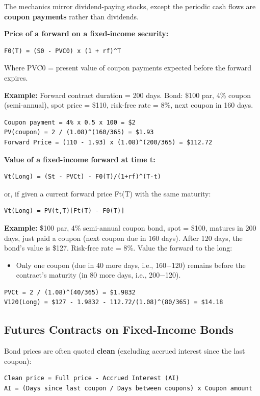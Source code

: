 \documentclass[12pt,openany]{book}
\theoremstyle{definition}
\theoremstyle{remark}
\begin{document}
The mechanics mirror dividend-paying stocks, except the periodic cash flows are \textbf{coupon payments} rather than dividends.

\textbf{Price of a forward on a fixed-income security:}
\begin{lstlisting}[style=notesCode]
F0(T) = (S0 - PVC0) x (1 + rf)^T
\end{lstlisting}
Where PVC0 = present value of coupon payments expected before the forward expires.

\textbf{Example:} Forward contract duration = 200 days. Bond: \$100 par, 4\% coupon (semi-annual), spot price = \$110, risk-free rate = 8\%, next coupon in 160 days.
\begin{lstlisting}[style=notesCode]
Coupon payment = 4% x 0.5 x 100 = $2
PV(coupon) = 2 / (1.08)^(160/365) = $1.93
Forward Price = (110 - 1.93) x (1.08)^(200/365) = $112.72
\end{lstlisting}

\textbf{Value of a fixed-income forward at time t:}
\begin{lstlisting}[style=notesCode]
Vt(Long) = (St - PVCt) - F0(T)/(1+rf)^(T-t)
\end{lstlisting}
or, if given a current forward price Ft(T) with the same maturity:
\begin{lstlisting}[style=notesCode]
Vt(Long) = PV(t,T)[Ft(T) - F0(T)]
\end{lstlisting}

\textbf{Example:} \$100 par, 4\% semi-annual coupon bond, spot = \$100, matures in 200 days, just paid a coupon (next coupon due in 160 days). After 120 days, the bond's value is \$127. Risk-free rate = 8\%. Value the forward to the long:
\begin{itemize}
\item Only one coupon (due in 40 more days, i.e., 160−120) remains before the contract's maturity (in 80 more days, i.e., 200−120).
\end{itemize}
\begin{lstlisting}[style=notesCode]
PVCt = 2 / (1.08)^(40/365) = $1.9832
V120(Long) = $127 - 1.9832 - 112.72/(1.08)^(80/365) = $14.18
\end{lstlisting}

\subsection{Futures Contracts on Fixed-Income Bonds}

Bond prices are often quoted \textbf{clean} (excluding accrued interest since the last coupon):
\begin{lstlisting}[style=notesCode]
Clean price = Full price - Accrued Interest (AI)
AI = (Days since last coupon / Days between coupons) x Coupon amount
\end{lstlisting}
\end{document}
